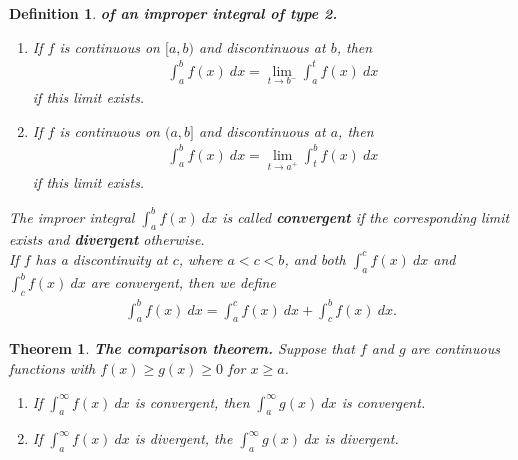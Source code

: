 \documentclass{article}
\theoremstyle{sltheorem}
\newtheorem{definition}{Definition}[section]
\newtheorem{theorem}{Theorem}[section]
\begin{document}
\begin{definition}
    \textbf{of an improper integral of type 2.}
    \begin{enumerate}
        \item If $f$ is continuous on $[a,b)$ and discontinuous at $b$, then
        \begin{align*}
            \int_a^b f(x)\:dx = \lim_{t\to b^-}\int_a^t f(x)\: dx
        \end{align*}
        if this limit exists.
        \item If $f$ is continuous on $(a,b]$ and discontinuous at $a$, then
        \begin{align*}
            \int_a^b f(x)\:dx = \lim_{t\to a^+}\int_t^b f(x)\: dx
        \end{align*}
        if this limit exists.
    \end{enumerate}
    The improer integral $\int_a^b f(x)\:dx$ is called \textbf{convergent} if the corresponding limit exists and \textbf{divergent} otherwise.\\
    If $f$ has a discontinuity at $c$, where $a<c<b$, and both $\int_a^c f(x)\:dx$ and $\int_c^b f(x)\:dx$ are convergent, then we define
    \begin{align*}
        \int_a^b f(x)\: dx = \int_a^c f(x)\:dx + \int_c^b f(x)\:dx.
    \end{align*}
\end{definition}
\begin{theorem}
    \textbf{The comparison theorem.} Suppose that $f$ and $g$ are continuous functions with $f(x)\geq g(x)\geq 0$ for $x\geq a$.
    \begin{enumerate}
        \item If $\int_a^\infty f(x)\:dx$ is convergent, then $\int_a^\infty g(x)\:dx$ is convergent.
        \item If $\int_a^\infty f(x)\:dx$ is divergent, the $\int_a^\infty g(x)\:dx$ is divergent.
    \end{enumerate}
\end{theorem}
\end{document}

